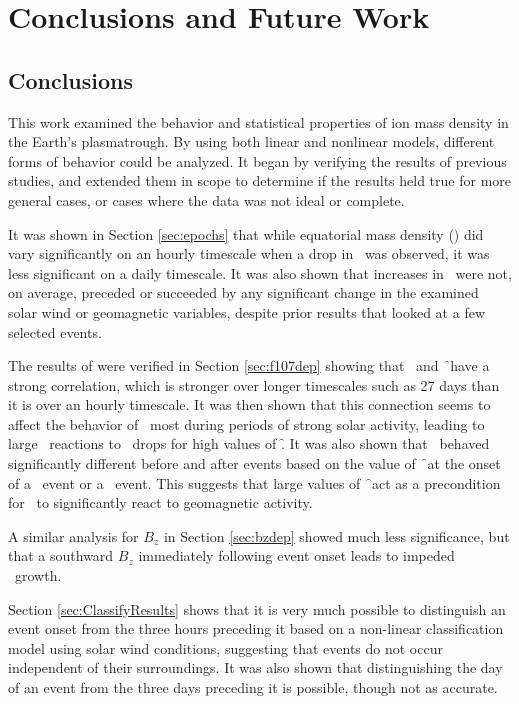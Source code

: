 \chapter[Conclusions and Future Work]{Conclusions and Future Work}

\section{Conclusions}
This work examined the behavior and statistical properties of ion mass density in the Earth's plasmatrough. By using both linear and nonlinear models, different forms of behavior could be analyzed. It began by verifying the results of previous studies, and extended them in scope to determine if the results held true for more general cases, or cases where the data was not ideal or complete. 

It was shown in Section \ref{sec:epochs} that while equatorial mass density (\req) did vary significantly on an hourly timescale when a drop in \dst\ was observed, it was less significant on a daily timescale. It was also shown that increases in \req\ were not, on average, preceded or succeeded by any significant change in the examined solar wind or geomagnetic variables, despite prior results that looked at a few selected events. 

The results of \cite{Takahashi2010SolarCycleVariation} were verified in Section \ref{sec:f107dep} showing that \req\ and \f\ have a strong correlation, which is stronger over longer timescales such as 27 days than it is over an hourly timescale. It was then shown that this connection seems to affect the behavior of \req\ most during periods of strong solar activity, leading to large \req\ reactions to \dst\ drops for high values of \f.  It was also shown that \req\ behaved significantly different before and after events based on the value of \f\ at the onset of a \req\ event or a \dst\ event.  This suggests that large values of \f\ act as a precondition for \req\ to significantly react to geomagnetic activity.

A similar analysis for $B_z$ in Section \ref{sec:bzdep} showed much less significance, but that a southward $B_z$ immediately following event onset leads to impeded \req\ growth.

Section \ref{sec:ClassifyResults} shows that it is very much possible to distinguish an event onset from the three hours preceding it based on a non-linear classification model using solar wind conditions, suggesting that events do not occur independent of their surroundings. It was also shown that distinguishing the day of an event from the three days preceding it is possible, though not as accurate.

